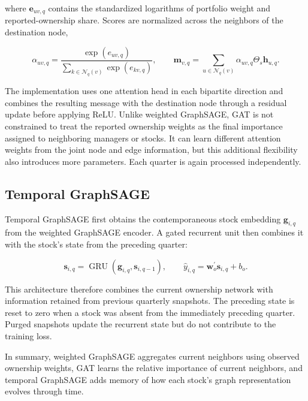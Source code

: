\noindent
where \(\mathbf{e}_{uv,q}\) contains the standardized logarithms of portfolio weight and reported-ownership share. Scores are normalized across the neighbors of the destination node,

\begin{equation}
    \alpha_{uv,q}
    =
    \frac{\exp(e_{uv,q})}
    {\sum_{k\in\mathcal{N}_q(v)}\exp(e_{kv,q})},
    \qquad
    \mathbf{m}_{v,q}
    =
    \sum_{u\in\mathcal{N}_q(v)}
    \alpha_{uv,q}\Theta_s\mathbf{h}_{u,q}.
    \label{eq:gat_attention_weights}
\end{equation}

\noindent
The implementation uses one attention head in each bipartite direction and combines the resulting message with the destination node through a residual update before applying ReLU. Unlike weighted GraphSAGE, GAT is not constrained to treat the reported ownership weights as the final importance assigned to neighboring managers or stocks. It can learn different attention weights from the joint node and edge information, but this additional flexibility also introduces more parameters. Each quarter is again processed independently.

\subsection{Temporal GraphSAGE}

Temporal GraphSAGE first obtains the contemporaneous stock embedding \(\mathbf{g}_{i,q}\) from the weighted GraphSAGE encoder. A gated recurrent unit then combines it with the stock's state from the preceding quarter:

\begin{equation}
    \mathbf{s}_{i,q}
    =
    \operatorname{GRU}
    \left(
        \mathbf{g}_{i,q},
        \mathbf{s}_{i,q-1}
    \right),
    \qquad
    \hat{y}_{i,q}
    =
    \mathbf{w}_o^{\prime}\mathbf{s}_{i,q}+b_o.
    \label{eq:temporal_graphsage}
\end{equation}

\noindent
This architecture therefore combines the current ownership network with information retained from previous quarterly snapshots. The preceding state is reset to zero when a stock was absent from the immediately preceding quarter. Purged snapshots update the recurrent state but do not contribute to the training loss.

In summary, weighted GraphSAGE aggregates current neighbors using observed ownership weights, GAT learns the relative importance of current neighbors, and temporal GraphSAGE adds memory of how each stock's graph representation evolves through time.

